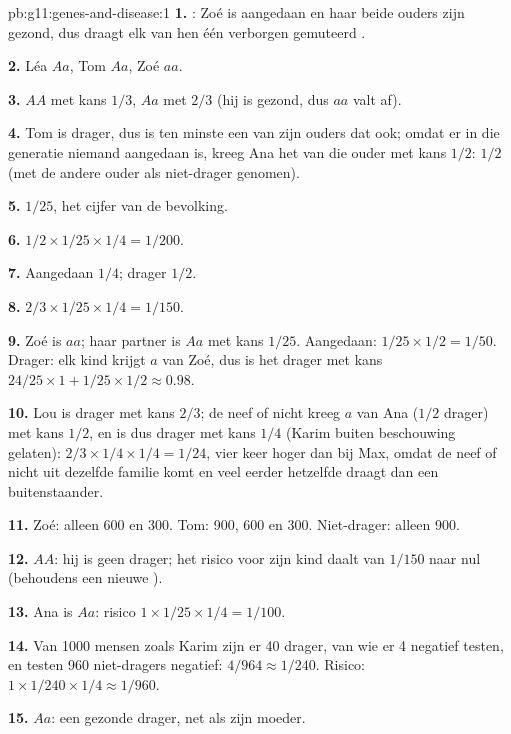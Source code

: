\begin{solution}{pb:g11:genes-and-disease:1}
\textbf{1.} : Zoé is aangedaan en haar beide ouders zijn gezond,
dus draagt elk van hen één verborgen gemuteerd .

\textbf{2.} Léa $Aa$, Tom $Aa$, Zoé $aa$.

\textbf{3.} $AA$ met kans $1/3$, $Aa$ met $2/3$ (hij is gezond, dus $aa$
valt af).

\textbf{4.} Tom is drager, dus is ten minste een van zijn ouders dat ook;
omdat er in die generatie niemand aangedaan is, kreeg Ana het  van
die ouder met kans $1/2$: $1/2$ (met de andere ouder als niet-drager
genomen).

\textbf{5.} $1/25$, het cijfer van de bevolking.

\textbf{6.} $1/2 \times 1/25 \times 1/4 = 1/200$.

\textbf{7.} Aangedaan $1/4$; drager $1/2$.

\textbf{8.} $2/3 \times 1/25 \times 1/4 = 1/150$.

\textbf{9.} Zoé is $aa$; haar partner is $Aa$ met kans $1/25$. Aangedaan:
$1/25 \times 1/2 = 1/50$. Drager: elk kind krijgt $a$ van Zoé, dus is het
drager met kans $24/25 \times 1 + 1/25 \times
1/2 \approx 0.98$.

\textbf{10.} Lou is drager met kans $2/3$; de neef of nicht kreeg $a$ van
Ana ($1/2$ drager) met kans $1/2$, en is dus drager met kans $1/4$ (Karim
buiten beschouwing gelaten): $2/3 \times 1/4
\times 1/4 = 1/24$, vier keer hoger dan bij Max, omdat de neef of nicht
uit dezelfde familie komt en veel eerder hetzelfde  draagt dan een
buitenstaander.

\textbf{11.} Zoé: alleen 600 en 300. Tom: 900, 600 en 300. Niet-drager:
alleen 900.

\textbf{12.} $AA$: hij is geen drager; het risico voor zijn kind daalt van
$1/150$ naar nul (behoudens een nieuwe ).

\textbf{13.} Ana is $Aa$: risico $1 \times 1/25 \times 1/4 = 1/100$.

\textbf{14.} Van 1000 mensen zoals Karim zijn er 40 drager, van wie er 4
negatief testen, en testen 960 niet-dragers negatief: $4/964 \approx
1/240$. Risico: $1 \times 1/240 \times 1/4 \approx 1/960$.

\textbf{15.} $Aa$: een gezonde drager, net als zijn moeder.


\end{solution}

